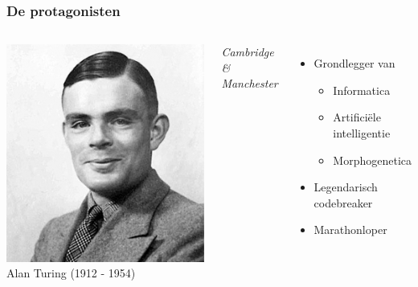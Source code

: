 \documentclass{beamer}
\begin{document}
\begin{frame}
    \frametitle{De protagonisten}
    \begin{columns}
        \includegraphics[width=\textwidth]{Turing.jpg}
        {\Large Alan Turing} (1912 - 1954) 

        \emph{Cambridge \& Manchester}
        \begin{itemize}
            \item Grondlegger van
            \begin{itemize}
                \item Informatica
                \item Artificiële intelligentie
                \item Morphogenetica
            \end{itemize}
            \item Legendarisch codebreaker
            \item Marathonloper
        \end{itemize}    
    \end{columns}
\end{frame}
\end{document}
